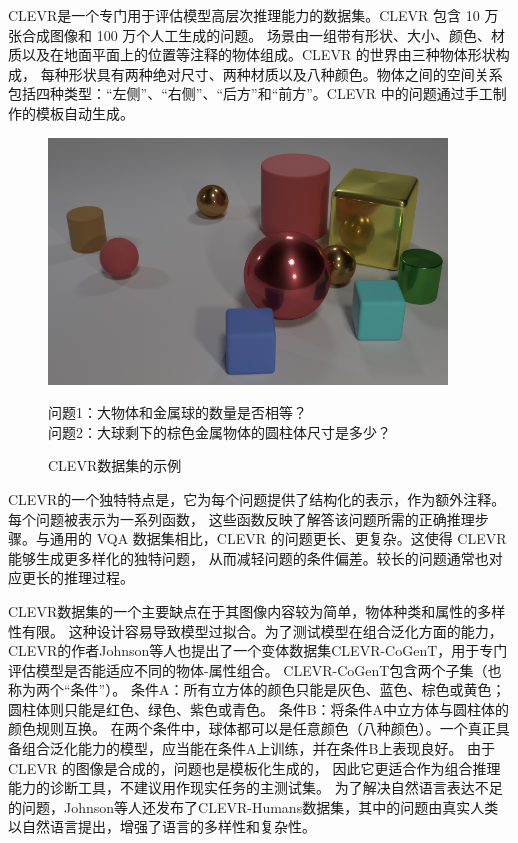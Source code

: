 CLEVR\cite{johnson2017clevr}是一个专门用于评估模型高层次推理能力的数据集。CLEVR 包含 10 万张合成图像和 100 万个人工生成的问题。
场景由一组带有形状、大小、颜色、材质以及在地面平面上的位置等注释的物体组成。CLEVR 的世界由三种物体形状构成，
每种形状具有两种绝对尺寸、两种材质以及八种颜色。物体之间的空间关系包括四种类型：“左侧”、“右侧”、“后方”和“前方”。CLEVR 中的问题通过手工制作的模板自动生成。
\begin{figure}[h]
    \centering
    \includegraphics[scale=0.5]{figures/clevr-example.png}
    \begin{center}
        \footnotesize 问题1：大物体和金属球的数量是否相等？\\
        \footnotesize 问题2：大球剩下的棕色金属物体的圆柱体尺寸是多少？\\
    \end{center}
    \caption{CLEVR数据集的示例}
    \label{fig:clevr-example}
\end{figure}
CLEVR的一个独特特点是，它为每个问题提供了结构化的表示，作为额外注释。每个问题被表示为一系列函数，
这些函数反映了解答该问题所需的正确推理步骤。与通用的 VQA 数据集相比，CLEVR 的问题更长、更复杂。这使得 CLEVR 能够生成更多样化的独特问题，
从而减轻问题的条件偏差。较长的问题通常也对应更长的推理过程。

CLEVR数据集的一个主要缺点在于其图像内容较为简单，物体种类和属性的多样性有限。
这种设计容易导致模型过拟合。为了测试模型在组合泛化方面的能力，
CLEVR的作者Johnson等人也提出了一个变体数据集CLEVR-CoGenT\cite{johnson2017clevr}，用于专门评估模型是否能适应不同的物体-属性组合。
CLEVR-CoGenT包含两个子集（也称为两个“条件”）。
条件A：所有立方体的颜色只能是灰色、蓝色、棕色或黄色；圆柱体则只能是红色、绿色、紫色或青色。
条件B：将条件A中立方体与圆柱体的颜色规则互换。
在两个条件中，球体都可以是任意颜色（八种颜色）。一个真正具备组合泛化能力的模型，应当能在条件A上训练，并在条件B上表现良好。
由于 CLEVR 的图像是合成的，问题也是模板化生成的，
因此它更适合作为组合推理能力的诊断工具，不建议用作现实任务的主测试集。
为了解决自然语言表达不足的问题，Johnson等人还发布了CLEVR-Humans数据集\cite{johnson2017clevr}，其中的问题由真实人类以自然语言提出，增强了语言的多样性和复杂性。
